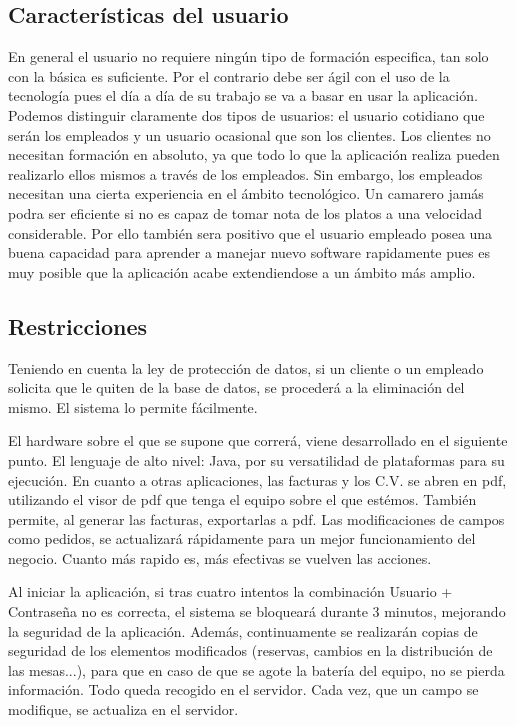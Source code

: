 \documentclass[spanish,a4paper,12pt]{report}		%
\begin{document}
\subsection{Características del usuario}
	En general el usuario no requiere ningún tipo de formación especifica, tan solo con la básica es suficiente. Por el contrario debe ser ágil con el uso de la tecnología pues el día a día de su trabajo se va a basar en usar la aplicación. Podemos distinguir claramente dos tipos de usuarios: el usuario cotidiano que serán los empleados y un usuario ocasional que son los clientes. Los clientes no necesitan formación en absoluto, ya que todo lo que la aplicación realiza pueden realizarlo ellos mismos a través de los empleados. Sin embargo, los empleados necesitan una cierta experiencia en el ámbito tecnológico. Un camarero jamás podra ser eficiente si no es capaz de tomar nota de los platos a una velocidad considerable. Por ello también sera positivo que el usuario empleado posea una buena capacidad para aprender a manejar nuevo software rapidamente pues es muy posible que la aplicación acabe extendiendose a un ámbito más amplio.

\subsection{Restricciones}

Teniendo en cuenta la ley de protección de datos, si un cliente o un empleado solicita que le quiten de la base de datos, se procederá a la eliminación del mismo. El sistema lo permite fácilmente. 

El hardware sobre el que se supone que correrá, viene desarrollado en el siguiente punto. El lenguaje de alto nivel: Java, por su versatilidad de plataformas para su ejecución. En cuanto a otras aplicaciones, las facturas y los C.V. se abren en pdf, utilizando el visor de pdf que tenga el equipo sobre el que estémos. También permite, al generar las facturas, exportarlas a pdf. Las modificaciones de campos como pedidos, se actualizará rápidamente para un mejor funcionamiento del negocio. Cuanto más rapido es, más efectivas se vuelven las acciones.

Al iniciar la aplicación, si tras cuatro intentos la combinación Usuario + Contraseña no es correcta, el sistema se bloqueará durante 3 minutos, mejorando la seguridad de la aplicación. Además, continuamente se realizarán copias de seguridad de los elementos modificados (reservas, cambios en la distribución de las mesas...), para que en caso de que se agote la batería del equipo, no se pierda información. Todo queda recogido en el servidor. Cada vez, que un campo se modifique, se actualiza en el servidor.
\end{document}
